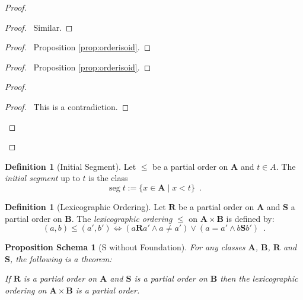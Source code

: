 \documentclass{book}
\let\qed\relax
\newtheorem{props}[ax]{Proposition Schema}
\theoremstyle{definition}
\newtheorem{df}[ax]{Definition}
\newcommand{\seg}{\ensuremath{\operatorname{seg}}}
\begin{document}
\begin{proof}
\begin{proof}
	\pf\ Similar.
\end{proof}
\begin{proof}
	\pf\ Proposition \ref{prop:orderisoid}.
\end{proof}
\begin{proof}
	\pf\ Proposition \ref{prop:orderisoid}.
\end{proof}
\begin{proof}
	\qedstep
	\begin{proof}
		\pf\ This is a contradiction.
	\end{proof}
\end{proof}
\qed
\end{proof}

\begin{df}[Initial Segment]
Let $\leq$ be a partial order on $\mathbf{A}$ and $t \in A$. The \emph{initial segment} up to $t$ is the class
\[ \seg t := \{ x \in \mathbf{A} \mid x < t \} \enspace . \]
\end{df}

\begin{df}[Lexicographic Ordering]
Let $\mathbf{R}$ be a partial order on $\mathbf{A}$ and $\mathbf{S}$ a partial order on $\mathbf{B}$. The \emph{lexicographic ordering} $\leq$ on $\mathbf{A} \times \mathbf{B}$ is defined by:
\[ (a,b) \leq (a',b') \Leftrightarrow (a \mathbf{R} a' \wedge a \neq a') \vee (a = a' \wedge b \mathbf{S} b') \enspace . \]
\end{df}

\begin{props}[S without Foundation]
\label{prop:lexicposet}
For any classes $\mathbf{A}$, $\mathbf{B}$, $\mathbf{R}$ and $\mathbf{S}$, the following is a theorem:

If $\mathbf{R}$ is a partial order on $\mathbf{A}$ and $\mathbf{S}$ is a partial order on $\mathbf{B}$ then the lexicographic ordering on $\mathbf{A} \times \mathbf{B}$ is a partial order.
\end{props}
\end{document}
